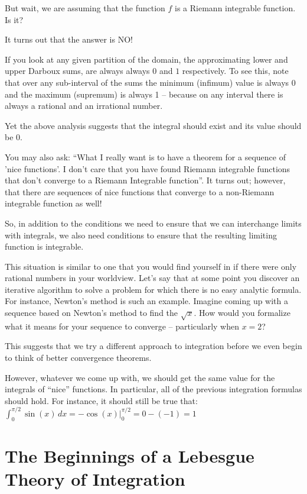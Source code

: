 \documentclass{article}
\begin{document}
But wait, we are assuming that the function $f$ is a Riemann integrable function. 
Is it?

It turns out that the answer is NO! 

If you look at any given partition of the domain, the approximating lower 
and upper Darboux sums, are always 
always $0$ and $1$ respectively. To see this, note that 
over any sub-interval of the sums the minimum (infimum) value is always 0 and 
the maximum (supremum) is always 1 -- because on any interval there is always a 
rational and an irrational number.

Yet the above analysis suggests that the integral should exist and its value 
should be $0$.


You may also ask: ``What I really want is to have a theorem for a sequence of 
'nice functions'. I don't care that you have found Riemann integrable functions that
don't converge to a Riemann Integrable function''. 
It turns out; however, that there are sequences of nice functions that converge 
to a non-Riemann integrable function as well!

So, in addition to the conditions we need to ensure that we can interchange 
limits with integrals, we also need conditions to ensure that the 
resulting limiting function is integrable.

This situation is similar to one that you would find yourself in if there were 
only rational numbers in your worldview. Let's say that at some point 
you discover an iterative 
algorithm to solve a problem for which there is no easy analytic formula. 
For instance, Newton's method is such an example. Imagine coming up with a sequence 
based on Newton's method to find the $\sqrt{x}$. How would you formalize what 
it means for your sequence to converge -- particularly when $x = 2$?

This suggests that we try a different approach to integration before we even
begin to think of better convergence theorems. 

However, whatever we come up with, we should get the same value for the 
integrals of ``nice'' functions. In particular, all of the previous integration 
formulas should hold. For instance, it should still be true that: 
$\int_0^{\pi / 2} \sin(x) \, dx = -\cos(x)|_{0}^{\pi / 2} = 0 - (-1) = 1$


\section{The Beginnings of a Lebesgue Theory of Integration}
\end{document}
